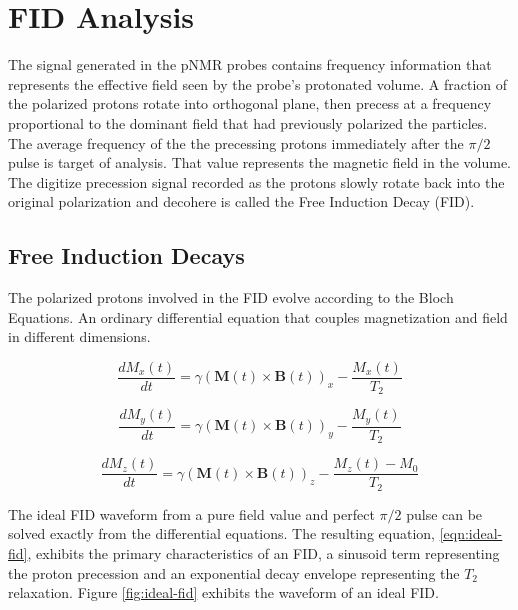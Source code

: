 \chapter{FID Analysis}

The signal generated in the pNMR probes contains frequency information that represents the effective field seen by the probe's protonated  volume.  A fraction of the polarized protons rotate into orthogonal plane, then precess at a frequency proportional to the dominant field that had previously polarized the particles.  The average frequency of the the precessing protons immediately after the $\pi/2$ pulse is target of analysis.  That value represents the magnetic field in the volume.  The digitize precession signal recorded as the protons slowly rotate back into the original polarization and decohere is called the Free Induction Decay (FID).


\section{Free Induction Decays}

The polarized protons involved in the FID evolve according to the Bloch Equations.  An ordinary differential equation that couples magnetization and field in different dimensions.

\begin{equation}
\frac{dM_x(t)}{dt} = 
\gamma (\mathbf{M}(t) \times \mathbf{B}(t))_x - \frac{M_x(t)}{T_2}
\label{eqn:bloch-x}
\end{equation}

\begin{equation}
\frac{dM_y(t)}{dt} = 
\gamma (\mathbf{M}(t)\times \mathbf{B}(t))_y - \frac{M_y(t)}{T_2}
\label{eqn:bloch-y}
\end{equation}

\begin{equation}
\frac{dM_z(t)}{dt} = 
\gamma (\mathbf{M}(t) \times \mathbf{B}(t))_z - \frac{M_z(t) - M_0}{T_2}
\label{eqn:bloch-z}
\end{equation}

The ideal FID waveform from a pure field value and perfect $\pi/2$ pulse can be solved exactly from the differential equations.  The resulting equation, \ref{eqn:ideal-fid}, exhibits the primary characteristics of an FID, a sinusoid term representing the proton precession and an exponential decay envelope representing the $T_2$ relaxation.  Figure \ref{fig:ideal-fid} exhibits the waveform of an ideal FID.

